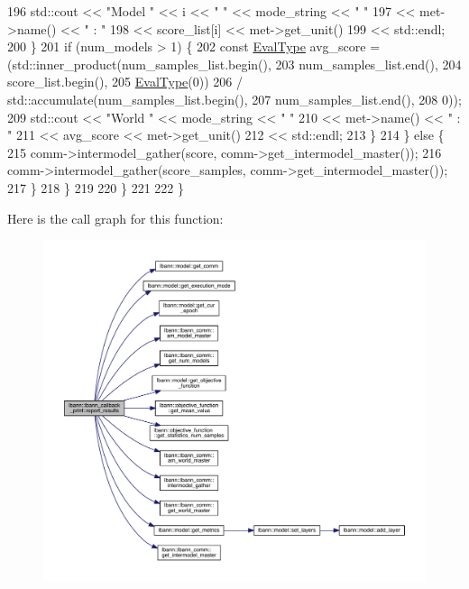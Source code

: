 \begin{DoxyCode}
196           std::cout << \textcolor{stringliteral}{"Model "} << i << \textcolor{stringliteral}{" "} << mode\_string << \textcolor{stringliteral}{" "}
197                     << met->name() << \textcolor{stringliteral}{" : "}
198                     << score\_list[i] << met->get\_unit()
199                     << std::endl;
200         \}
201         \textcolor{keywordflow}{if} (num\_models > 1) \{
202           \textcolor{keyword}{const} \hyperlink{base_8hpp_a3266f5ac18504bbadea983c109566867}{EvalType} avg\_score = (std::inner\_product(num\_samples\_list.begin(),
203                                                          num\_samples\_list.end(),
204                                                          score\_list.begin(),
205                                                          \hyperlink{base_8hpp_a3266f5ac18504bbadea983c109566867}{EvalType}(0))
206                                       / std::accumulate(num\_samples\_list.begin(),
207                                                         num\_samples\_list.end(),
208                                                         0));
209           std::cout << \textcolor{stringliteral}{"World "} << mode\_string << \textcolor{stringliteral}{" "}
210                     << met->name() << \textcolor{stringliteral}{" : "}
211                     << avg\_score << met->get\_unit()
212                     << std::endl;
213         \}
214       \} \textcolor{keywordflow}{else} \{
215         comm->intermodel\_gather(score, comm->get\_intermodel\_master());
216         comm->intermodel\_gather(score\_samples, comm->get\_intermodel\_master());
217       \}
218     \}
219 
220   \}
221 
222 \}
\end{DoxyCode}
Here is the call graph for this function\+:\nopagebreak
\begin{figure}[H]
\begin{center}
\leavevmode
\includegraphics[width=350pt]{classlbann_1_1lbann__callback__print_a50117faa3edb961ddd87c5c5806820b2_cgraph}
\end{center}
\end{figure}
